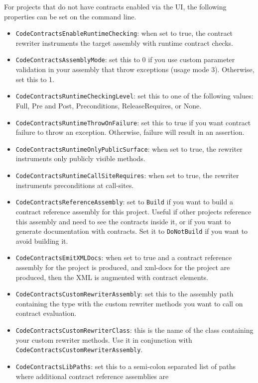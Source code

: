 \documentclass{article}
\newcommand{\code}[1]{\lstinline{#1}}
\begin{document}
For projects that do not have contracts enabled via the UI, the following properties can be set on the command line.
\begin{itemize}
\item \code{CodeContractsEnableRuntimeChecking}: when set to true, the
  contract rewriter instruments the target assembly with runtime
  contract checks.
\item \code{CodeContractsAssemblyMode}: set this to 0 if you use
  custom parameter validation in your assembly that throw exceptions
  (usage mode 3). Otherwise, set this to 1.
\item \code{CodeContractsRuntimeCheckingLevel}: set this to one of the
  following values: Full, Pre and Post, Preconditions,
  ReleaseRequires, or None.
\item \code{CodeContractsRuntimeThrowOnFailure}: set this to true if
  you want contract failure to throw an exception. Otherwise, failure
  will result in an assertion.
\item \code{CodeContractsRuntimeOnlyPublicSurface}: when set to true,
  the rewriter instruments only publicly visible methods.
\item \code{CodeContractsRuntimeCallSiteRequires}: when set to true,
  the rewriter instruments preconditions at call-sites.
\item \code{CodeContractsReferenceAssembly}: set to \code{Build} if
  you want to build a contract reference assembly for this
  project. Useful if other projects reference this assembly and need
  to see the contracts inside it, or if you want to generate
  documentation with contracts. Set it to \code{DoNotBuild} if you
  want to avoid building it.
\item \code{CodeContractsEmitXMLDocs}: when set to true and a contract reference assembly for
  the project is produced, and xml-docs
  for the project are produced, then the XML is augmented with
  contract elements.
\item \code{CodeContractsCustomRewriterAssembly}: set this to the
  assembly path containing the type with the custom rewriter methods
  you want to call on contract evaluation.
\item \code{CodeContractsCustomRewriterClass}: this is the name of the
  class containing your custom rewriter methods. Use it in conjunction
  with \code{CodeContractsCustomRewriterAssembly}.
\item \code{CodeContractsLibPaths}: set this to a semi-colon separated
  list of paths where additional contract reference assemblies are

\end{itemize}
\end{document}
